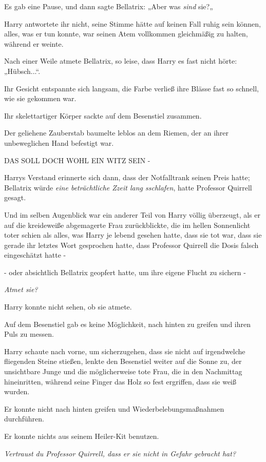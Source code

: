 {Es gab eine Pause, und dann sagte Bellatrix: „Aber was \emph{sind} sie?„

Harry antwortete ihr nicht, seine Stimme hätte auf keinen Fall ruhig sein können, alles, was er tun konnte, war seinen Atem vollkommen gleichmäßig zu halten, während er weinte.

Nach einer Weile atmete Bellatrix, so leise, dass Harry es fast nicht hörte: „Hübsch...“.

Ihr Gesicht entspannte sich langsam, die Farbe verließ ihre Blässe fast so schnell, wie sie gekommen war.

Ihr skelettartiger Körper sackte auf dem Besenstiel zusammen.

Der geliehene Zauberstab baumelte leblos an dem Riemen, der an ihrer unbeweglichen Hand befestigt war.

DAS SOLL DOCH WOHL EIN WITZ SEIN -

Harrys Verstand erinnerte sich dann, dass der Notfalltrank seinen Preis hatte; Bellatrix würde \emph{eine beträchtliche Zzeit lang sschlafen}, hatte Professor Quirrell gesagt.

Und im selben Augenblick war ein anderer Teil von Harry völlig überzeugt, als er auf die kreideweiße abgemagerte Frau zurückblickte, die im hellen Sonnenlicht toter schien als alles, was Harry je lebend gesehen hatte, dass sie tot war, dass sie gerade ihr letztes Wort gesprochen hatte, dass Professor Quirrell die Dosis falsch eingeschätzt hatte -

- oder absichtlich Bellatrix geopfert hatte, um ihre eigene Flucht zu sichern -

\emph{\emph{Atmet sie?}}

Harry konnte nicht sehen, ob sie atmete.

Auf dem Besenstiel gab es keine Möglichkeit, nach hinten zu greifen und ihren Puls zu messen.

Harry schaute nach vorne, um sicherzugehen, dass sie nicht auf irgendwelche fliegenden Steine stießen, lenkte den Besenstiel weiter auf die Sonne zu, der unsichtbare Junge und die möglicherweise tote Frau, die in den Nachmittag hineinritten, während seine Finger das Holz so fest ergriffen, dass sie weiß wurden.

Er konnte nicht nach hinten greifen und Wiederbelebungsmaßnahmen durchführen.

Er konnte nichts aus seinem Heiler-Kit benutzen.

\emph{\emph{Vertraust du Professor Quirrell, dass er sie nicht in Gefahr gebracht hat?}}

}
